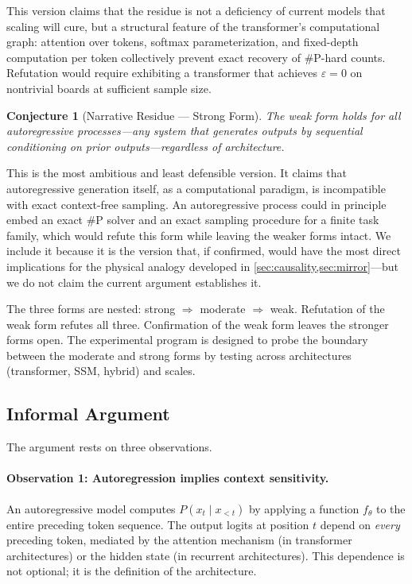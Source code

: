\documentclass[12pt,a4paper]{article}
\newtheorem{conjecture}[theorem]{Conjecture}
\theoremstyle{definition}
\theoremstyle{remark}
\begin{document}
This version claims that the residue is not a deficiency of current
models that scaling will cure, but a structural feature of the
transformer's computational graph: attention over tokens, softmax
parameterization, and fixed-depth computation per token collectively
prevent exact recovery of \textsc{\#P}-hard counts.  Refutation would
require exhibiting a transformer that achieves $\varepsilon = 0$ on
nontrivial boards at sufficient sample size.

\begin{conjecture}[Narrative Residue --- Strong Form]
\label{conj:residue-strong}
The weak form holds for \emph{all} autoregressive processes---any
system that generates outputs by sequential conditioning on prior
outputs---regardless of architecture.
\end{conjecture}

This is the most ambitious and least defensible version.  It claims
that autoregressive generation itself, as a computational paradigm,
is incompatible with exact context-free sampling.  An autoregressive
process could in principle embed an exact \textsc{\#P} solver and an
exact sampling procedure for a finite task family, which would refute
this form while leaving the weaker forms intact.  We include it
because it is the version that, if confirmed, would have the most
direct implications for the physical analogy developed in
\cref{sec:causality,sec:mirror}---but we do not claim the current
argument establishes it.

\medskip

The three forms are nested: strong $\Rightarrow$ moderate
$\Rightarrow$ weak.  Refutation of the weak form refutes all three.
Confirmation of the weak form leaves the stronger forms open.  The
experimental program is designed to probe the boundary between
the moderate and strong forms by testing across architectures
(transformer, SSM, hybrid) and scales.

\subsection{Informal Argument}

The argument rests on three observations.

\paragraph{Observation 1: Autoregression implies context sensitivity.}

An autoregressive model computes $P(x_t \mid x_{<t})$ by applying a
function $f_\theta$ to the entire preceding token sequence.  The
output logits at position $t$ depend on \emph{every} preceding token,
mediated by the attention mechanism (in transformer architectures) or
the hidden state (in recurrent architectures).  This dependence is not
optional; it is the definition of the architecture.
\end{document}
